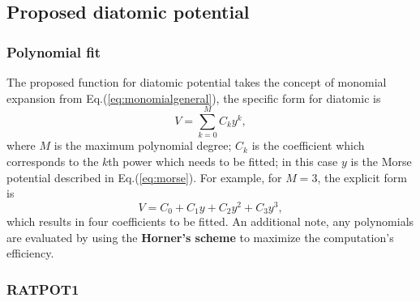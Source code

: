 \documentclass[12pt]{article}
\begin{document}
\subsection{Proposed diatomic potential}
\subsubsection{Polynomial fit}
The proposed function for diatomic potential takes the concept of monomial expansion from Eq.(\ref{eq:monomialgeneral}), the specific form for diatomic is
\begin{equation}
    V = \sum^M_{k=0}C_ky^k,
    \label{eq:proposeddiatomic}
\end{equation}
where $M$ is the maximum polynomial degree; $C_k$ is the coefficient which corresponds to the $k$th power which needs to be fitted; in this case $y$ is the Morse potential described in Eq.(\ref{eq:morse}). For example, for $M=3$, the explicit form is
\begin{equation}
    V = C_0 + C_1y + C_2y^2 + C_3y^3,
\end{equation}
which results in four coefficients to be fitted. An additional note, any polynomials are evaluated by using the \textbf{Horner's scheme} \cite{horner} to maximize the computation's efficiency.

\subsubsection{RATPOT1}
\end{document}
